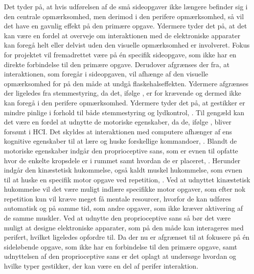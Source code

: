Det tyder på, at hvis udførelsen af de små sideopgaver ikke længere befinder sig i den centrale opmærksomhed, men derimod i den perifere opmærksomhed, så vil det have en gavnlig effekt på den primære opgave. Ydermere tyder det på, at det kan være en fordel at overveje om interaktionen med de elektroniske apparater kan foregå helt eller delvist uden den visuelle opmærksomhed er involveret. Fokus for projektet vil fremadrettet være på én specifik sideopgave, som ikke har en direkte forbindelse til den primære opgave. Derudover afgrænses der fra, at interaktionen, som foregår i sideopgaven, vil afhænge af den visuelle opmærksomhed for på den måde at undgå flaskehalseffekten. Ydermere afgrænses der ligeledes fra stemmestyring, da det, ifølge \textcite[s. 41]{PDF:PIEmbeddingHCIMicroManageMe}, er for krævende og dermed ikke kan foregå i den perifere opmærksomhed. Ydermere tyder det på, at  gestikker er mindre pinlige i forhold til både stemmestyring og lydkontrol, \parencite[s. 4]{PDF:AnExploratoryStudy}. Til gengæld kan det være en fordel at udnytte de motoriske egenskaber, da de, ifølge \textcite[s. 187]{PDF:PeripheralInteraction}, bliver forsømt i HCI. Det skyldes at interaktionen med computere afhænger af ens kognitive egenskaber til at lære og huske forskellige kommandoer, \parencite[s. 187]{PDF:PeripheralInteraction}. Blandt de motoriske egenskaber indgår den proprioceptive sans, som er evnen til opfatte hvor de enkelte kropsdele er i rummet samt hvordan de er placeret, \parencite[s. 193]{PDF:PeripheralInteraction}. Herunder indgår den kinæstetisk hukommelse, også kaldt muskel hukommelse, som evnen til at huske en specifik motor opgave ved repetition, \parencite[s. 193]{PDF:PeripheralInteraction}. Ved at udnyttet kinæstetisk hukommelse vil det være muligt indlære specifikke motor opgaver, som efter nok repetition kun vil kræve meget få mentale resourcer, hvorfor de kan udføres automatisk og på samme tid, som andre opgaver, som ikke kræver aktivering af de samme muskler. Ved at udnytte den proprioceptive sans så bør det være muligt at designe elektroniske apparater, som på den måde kan interageres med perifert, hvilket \textcite[s. 202]{PDF:PeripheralInteraction} ligeledes opfordre til.\blankline
%
Da der nu er afgrænset til at fokusere på én sideløbende opgave, som ikke har en forbindelse til den primære opgave, samt udnyttelsen af den proprioceptive sans er det oplagt at undersøge hvordan og hvilke typer gestikker, der kan være en del af perifer interaktion.      




 
